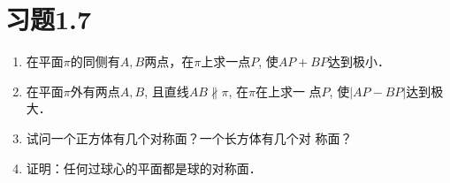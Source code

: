 \begin{solution}
    
\end{solution}

\begin{example}
    
\end{example}

\begin{solution}
    
\end{solution}

\begin{example}
    
\end{example}

\begin{solution}
    
\end{solution}

\begin{example}
    
\end{example}

\begin{solution}
    
\end{solution}
\begin{example}
    
\end{example}


\begin{solution}
    
\end{solution}






\section*{习题1.7}

\begin{enumerate}
    \item 在平面$\pi$的同侧有$A,B$两点，在$\pi$上求一点$P$, 使$AP+
    BP$达到极小．
    \item 在平面$\pi$外有两点$A,B$, 且直线$AB\nparallel \pi$, 在$\pi$在上求一
    点$P$, 使$|AP-BP|$达到极大．
    \item 试问一个正方体有几个对称面？一个长方体有几个对
    称面？
    \item 证明：任何过球心的平面都是球的对称面．
\end{enumerate}

